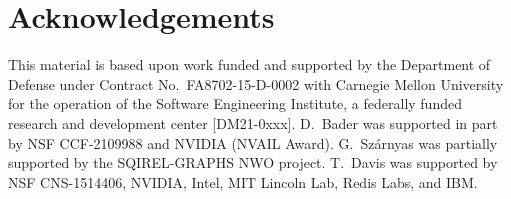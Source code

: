 \section*{Acknowledgements}

This material is based upon work funded and supported by the Department of
Defense under Contract No.~FA8702-15-D-0002 with Carnegie Mellon University for
the operation of the Software Engineering Institute, a federally funded research
and development center [DM21-0xxx].
D.~Bader was supported in part by NSF CCF-2109988 and NVIDIA (NVAIL Award).
G.~Sz\'arnyas was partially supported by the SQIREL-GRAPHS NWO project.
T.~Davis was supported by
NSF CNS-1514406, NVIDIA, Intel, MIT Lincoln Lab,
Redis Labs, and IBM.

